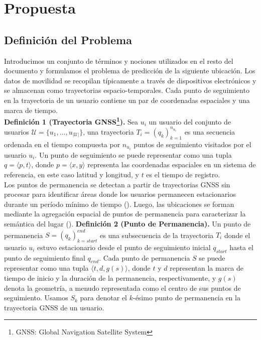 \chapter{Propuesta}\label{chapter:proposal}
\section{Definición del Problema}

Introducimos un conjunto de términos y nociones 
utilizados en el resto del documento y formulamos el problema de 
predicción de la siguiente ubicación. Los datos de movilidad se 
recopilan típicamente a través de dispositivos electrónicos y se 
almacenan como trayectorias espacio-temporales. Cada punto de 
seguimiento en la trayectoria de un usuario contiene un par de 
coordenadas espaciales y una marca de tiempo.\\

\textbf{Definición 1 (Trayectoria GNSS\footnote{GNSS: Global Navigation Satellite System}).} 
Sea $u_i$ un usuario del conjunto de usuarios 
$\mathcal{U} = \{u_1, \dots, u_{|\mathcal{U}|} \}$, una trayectoria 
$T_i = (q_k)_{k=1}^{n_{u_i}}$ es una secuencia ordenada en el 
tiempo compuesta por $n_{u_i}$ puntos de seguimiento visitados por
el usuario $u_i$. Un punto de seguimiento se puede representar 
como una 
tupla $q = \langle p, t \rangle$, donde $p = \langle x, y \rangle$ 
representa las coordenadas espaciales en un sistema de referencia, 
en este caso latitud y longitud, y $t$ es el tiempo de registro.\\

Los puntos de permanencia se detectan a partir de trayectorias GNSS 
sin procesar para identificar áreas donde los usuarios permanecen 
estacionarios durante un período mínimo de tiempo (\cite{li2008mining}). 
Luego, las ubicaciones se forman mediante la agregación espacial 
de puntos de permanencia para caracterizar la semántica del lugar (\cite{hariharan2004project,martin2023trackintel}).
\newpage
\textbf{Definición 2 (Punto de Permanencia).} 
Un punto de permanencia $S = (q_k)_{k=start}^{end}$ es una 
subsecuencia de la trayectoria $T_i$ donde el usuario $u_i$ estuvo 
estacionario desde el punto de seguimiento inicial $q_{start}$ 
hasta el punto de seguimiento final $q_{end}$. Cada punto de 
permanencia $S$ se puede representar como una tupla 
$\langle t, d, g(s) \rangle$, donde $t$ y $d$ representan la 
marca de tiempo de inicio y la duración de la permanencia, 
respectivamente, y $g(s)$ denota la geometría, a menudo 
representada como el centro de sus puntos de seguimiento. 
Usamos $S_k$ para denotar el $k$-ésimo punto de permanencia 
en la trayectoria GNSS de un usuario.\\


